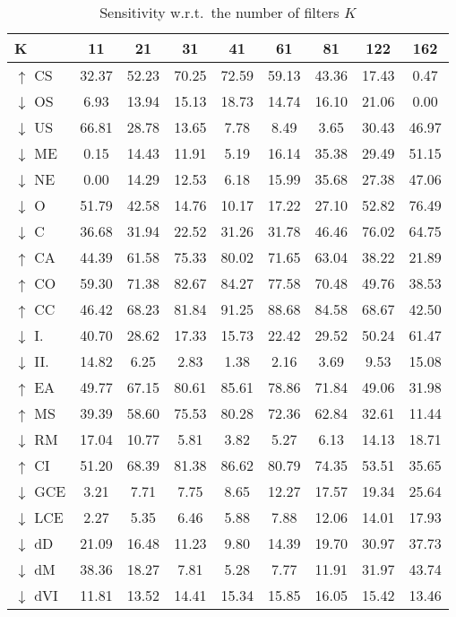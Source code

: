 \documentclass[journal]{IEEEtran}
\begin{document}
\begin{table*}
	\centering
	\caption{Sensitivity w.r.t.\ the number of filters $K$}
	\begin{tabular}{@{} l *{8}{S[table-format=2.3,detect-inline-weight=math,table-align-text-post=false]} @{}}
		\toprule
		{K}              & {11}  & {21}  & {31}  & {41}  & {61}  & {81}  & {122} & {162} \\
		\midrule
		$\uparrow$ CS    & 32.37 & 52.23 & 70.25 & 72.59 & 59.13 & 43.36 & 17.43 & 0.47 \\
		$\downarrow$ OS  & 6.93 & 13.94 & 15.13 & 18.73 & 14.74 & 16.10 & 21.06 & 0.00 \\
		$\downarrow$ US  & 66.81 & 28.78 & 13.65 & 7.78 & 8.49 & 3.65 & 30.43 & 46.97 \\
		$\downarrow$ ME  & 0.15 & 14.43 & 11.91 & 5.19 & 16.14 & 35.38 & 29.49 & 51.15 \\
		$\downarrow$ NE  & 0.00 & 14.29 & 12.53 & 6.18 & 15.99 & 35.68 & 27.38 & 47.06 \\
		$\downarrow$ O   & 51.79 & 42.58 & 14.76 & 10.17 & 17.22 & 27.10 & 52.82 & 76.49 \\
		$\downarrow$ C   & 36.68 & 31.94 & 22.52 & 31.26 & 31.78 & 46.46 & 76.02 & 64.75 \\
		$\uparrow$ CA    & 44.39 & 61.58 & 75.33 & 80.02 & 71.65 & 63.04 & 38.22 & 21.89 \\
		$\uparrow$ CO    & 59.30 & 71.38 & 82.67 & 84.27 & 77.58 & 70.48 & 49.76 & 38.53 \\
		$\uparrow$ CC    & 46.42 & 68.23 & 81.84 & 91.25 & 88.68 & 84.58 & 68.67 & 42.50 \\
		$\downarrow$ I.  & 40.70 & 28.62 & 17.33 & 15.73 & 22.42 & 29.52 & 50.24 & 61.47 \\
		$\downarrow$ II. & 14.82 & 6.25 & 2.83 & 1.38 & 2.16 & 3.69 & 9.53 & 15.08 \\
		$\uparrow$ EA    & 49.77 & 67.15 & 80.61 & 85.61 & 78.86 & 71.84 & 49.06 & 31.98 \\
		$\uparrow$ MS    & 39.39 & 58.60 & 75.53 & 80.28 & 72.36 & 62.84 & 32.61 & 11.44 \\
		$\downarrow$ RM  & 17.04 & 10.77 & 5.81 & 3.82 & 5.27 & 6.13 & 14.13 & 18.71 \\
		$\uparrow$ CI    & 51.20 & 68.39 & 81.38 & 86.62 & 80.79 & 74.35 & 53.51 & 35.65 \\
		$\downarrow$ GCE & 3.21 & 7.71 & 7.75 & 8.65 & 12.27 & 17.57 & 19.34 & 25.64 \\
		$\downarrow$ LCE & 2.27 & 5.35 & 6.46 & 5.88 & 7.88 & 12.06 & 14.01 & 17.93 \\
		$\downarrow$ dD  & 21.09 & 16.48 & 11.23 & 9.80 & 14.39 & 19.70 & 30.97 & 37.73 \\
		$\downarrow$ dM  & 38.36 & 18.27 & 7.81 & 5.28 & 7.77 & 11.91 & 31.97 & 43.74 \\
		$\downarrow$ dVI & 11.81 & 13.52 & 14.41 & 15.34 & 15.85 & 16.05 & 15.42 & 13.46 \\
		\bottomrule
	\end{tabular}
	\label{tbl:paramsense_filter_count}
\end{table*}
\end{document}
